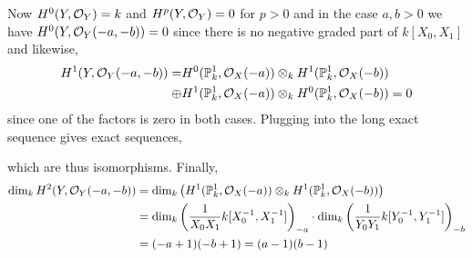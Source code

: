 \documentclass[12pt]{article}
\begin{document}
\begin{center}
\end{center}
Now $H^0(Y, \mathcal{O}_{Y}) = k$ and $H^p(Y, \mathcal{O}_{Y}) = 0$ for $p > 0$ and in the case $a, b > 0$ we have $H^0(Y, \mathcal{O}_{Y}(-a, -b)) = 0$ since there is no negative graded part of $k[X_0, X_1]$ and likewise,  \begin{align*}
H^1(Y, \mathcal{O}_{Y}(-a,-b)) = & H^0(\mathbb{P}^1_k, \mathcal{O}_{X}(-a)) \otimes_k H^1(\mathbb{P}^1_k, \mathcal{O}_{X}(-b)) 
\\
\oplus & H^1(\mathbb{P}^1_k, \mathcal{O}_{X}(-a)) \otimes_k H^0(\mathbb{P}^1_k, \mathcal{O}_{X}(-b)) = 0 
\end{align*}
since one of the factors is zero in both cases. Plugging into the long exact sequence gives exact sequences,
\begin{center}
\end{center}
which are thus isomorphisms. Finally,
\begin{align*}
\dim_k H^2(Y, \mathcal{O}_{Y}(-a,-b)) & = \dim_k \left( H^1(\mathbb{P}^1_k, \mathcal{O}_{X}(-a)) \otimes_k H^1(\mathbb{P}^1_k, \mathcal{O}_{X}(-b)) \right)  
\\
& = \dim_k \left( \frac{1}{X_0 X_1} k[X_0^{-1}, X_1^{-1}] \right)_{-a} \cdot \dim_k \left( \frac{1}{Y_0 Y_1} k[Y_0^{-1}, Y_1^{-1}] \right)_{-b} \\
& = (-a + 1)(-b + 1) = (a - 1)(b - 1)
\end{align*}
\end{document}
